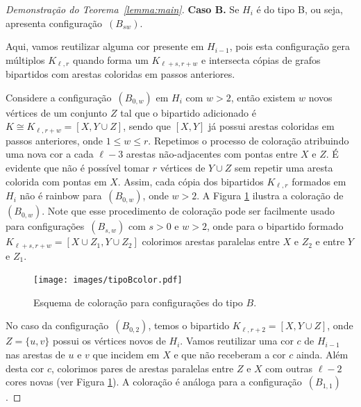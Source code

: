 \documentclass[12pt,a4paper]{book}
\newcommand{\K}{K_{\ell,r}} %
\begin{document}
\begin{proof}[Demonstração do Teorema~\ref{lemma:main}]
        \medskip \textbf{Caso B.} Se $H_i$ é do tipo B, ou seja, apresenta configuração~\hyperref[configB]{$(B_{sw})$}.
        
        Aqui, vamos reutilizar alguma cor presente em $H_{i-1}$, pois esta configuração gera múltiplos $\K$ quando forma  um $K_{\ell+s,r+w}$ e intersecta cópias de grafos bipartidos com arestas coloridas em passos anteriores.
        
      Considere a configuração~\hyperref[configB]{$(B_{0,w})$} em
      $H_i$ com $w > 2$, então existem $w$ novos vértices de um conjunto $Z$ tal que o bipartido adicionado é $K \cong K_{\ell,r+w} =[X, Y \cup Z]$, sendo que $[X,Y]$ já possui arestas coloridas em passos anteriores, 
      onde $1 \leq w \leq r$.  
      Repetimos o processo de coloração atribuindo uma nova cor a cada $\ell-3$ arestas 
      não-adjacentes com pontas entre $X$ e $Z$. 
      É evidente que não é possível tomar $r$ vértices de $Y \cup Z$ sem repetir uma aresta colorida com pontas em $X$.
      Assim, cada cópia dos bipartidos $\K$ formados em $H_i$ não é rainbow para~\hyperref[configB]{$(B_{0,w})$}, onde $w >2$. 
      A Figura \ref{fig:configBcor} ilustra a coloração de~\hyperref[configB]{$(B_{0,w})$}.
      Note que esse procedimento de coloração pode ser facilmente usado para configurações~\hyperref[configB]{$(B_{s,w})$} com $s>0$ e $w>2$, onde para o bipartido formado $K_{\ell+s,r+w} =[X\cup Z_1, Y \cup Z_2]$ colorimos arestas paralelas entre $X$ e $Z_2$ e entre $Y$ e $Z_1$.


 \begin{figure}[htb] \centering \texttt{[image: images/tipoBcolor.pdf]}
   \caption{Esquema de coloração para configurações do tipo $B$.}
   \label{fig:configBcor}
 \end{figure}
      
	  No caso da configuração~\hyperref[configB]{$(B_{0,2})$},
   temos  o bipartido $K_{\ell, r+2} = [X, Y \cup Z]$, onde $Z = \{u,v\}$ possui os vértices novos de $H_i$.
   Vamos reutilizar uma cor $c$ de $H_{i-1}$ nas arestas de $u$ e $v$ que incidem em $X$ e que não receberam a cor $c$ ainda.
   Além desta cor $c$, colorimos pares de arestas paralelas entre $Z$ e $X$ com outras $\ell-2$ cores novas (ver Figura \ref{fig:configBcor}).   
        A coloração é análoga para a configuração~\hyperref[configB]{$(B_{1,1})$}.

        

\end{proof}
\end{document}
